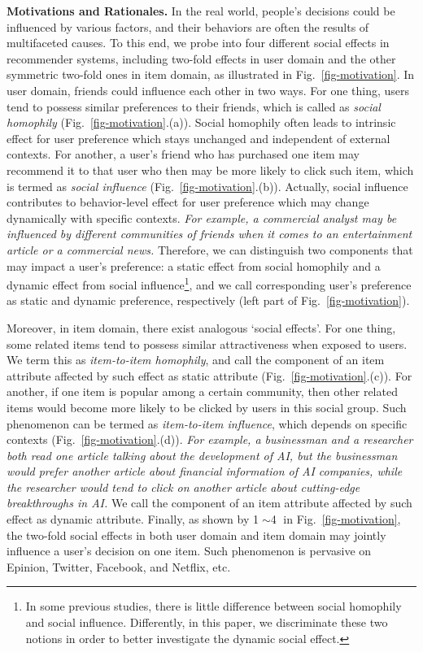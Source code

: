 \documentclass[sigconf]{acmart}
\begin{document}
\textbf{Motivations and Rationales.} 
In the real world, people's decisions could be influenced by various factors, and their behaviors are often the results of multifaceted causes. 
To this end, we probe into four different social effects in recommender systems, including two-fold effects in user domain and the other symmetric two-fold ones in item domain, as illustrated in Fig.~\ref{fig-motivation}. 
In user domain,
friends could influence each other in two ways. 
For one thing, users tend to possess similar preferences to their friends, which is called as \emph{social homophily} \cite{Homophily} (Fig.~\ref{fig-motivation}.(a)). 
Social homophily often leads to intrinsic effect for user preference which stays unchanged and independent of external contexts. 
For another, a user's friend who has purchased one item may recommend it to that user who then may be more likely to click such item, which is termed as \emph{social influence} \cite{Influence} (Fig.~\ref{fig-motivation}.(b)). Actually,
social influence contributes to behavior-level effect for user preference which may change dynamically with specific contexts. 
\emph{For example, a commercial analyst may be influenced by different communities of friends when it comes to an entertainment article or a commercial news.} 
Therefore, we can distinguish two components that may impact a user's preference: a static effect from social homophily and a dynamic effect from social influence\footnote{In some previous studies, there is little difference between social homophily and social influence. Differently, in this paper, we discriminate these two notions in order to better investigate the dynamic social effect.}, and we call corresponding user's preference as static and dynamic preference, respectively (left part of Fig.~\ref{fig-motivation}). 


Moreover, in item domain, there exist analogous `social effects'. 
For one thing, some related items tend to possess similar attractiveness when exposed to users. 
We term this as \emph{item-to-item homophily}, and call the component of an item attribute affected by such effect as static attribute (Fig.~\ref{fig-motivation}.(c)). 
For another, if one item is popular among a certain community, then other related items would become more likely to be clicked by users in this social group. 
Such phenomenon can be termed as \emph{item-to-item influence}, which depends on specific contexts (Fig.~\ref{fig-motivation}.(d)). 
\emph{For example, a businessman and a researcher both read one article talking about the development of AI, but the businessman would prefer another article about financial information of AI companies, while the researcher would tend to click on another article about cutting-edge breakthroughs in AI.} 
We call the component of an item attribute affected by such effect as dynamic attribute. 
Finally, as shown by \textcircled{1}$\sim$\textcircled{4} in Fig.~\ref{fig-motivation}, the two-fold social effects in both user domain and item domain may jointly influence a user's decision on one item. Such phenomenon is pervasive on Epinion, Twitter, Facebook, and Netflix, etc.
\end{document}
